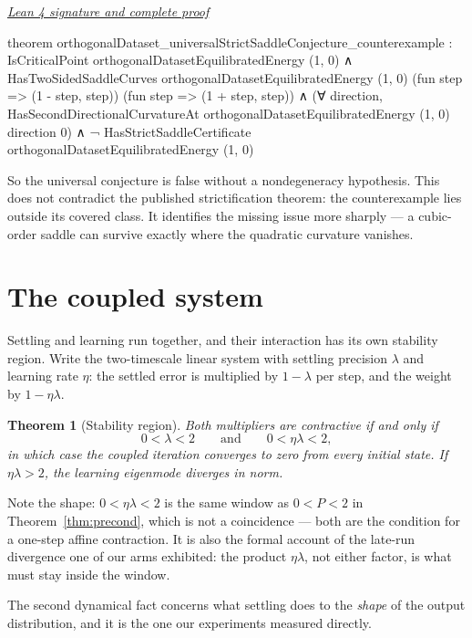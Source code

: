 \documentclass[11pt]{article}
\newtheorem{theorem}{Theorem}[section]
\newcommand{\leancommit}{f3a31db36bb2f944312ee31c1d86c2758109e83a}
\newcommand{\leansignaturelink}[2]{%
  \par\Needspace{0.3\textheight}\smallskip\noindent
  \href{https://github.com/zariuq/MeTTapedia/blob/\leancommit/#1\#L#2}{%
    \scriptsize\itshape Lean 4 signature and complete proof}\par\nobreak}
\begin{document}
\leansignaturelink{lean/mettapedia/Mettapedia/MachineLearning/NeuralNetworks/%
PredictiveCoding/EquilibratedEnergySaddles.lean}{319}
\begin{leansignature}
theorem orthogonalDataset_universalStrictSaddleConjecture_counterexample :
    IsCriticalPoint orthogonalDatasetEquilibratedEnergy (1, 0) ∧
      HasTwoSidedSaddleCurves orthogonalDatasetEquilibratedEnergy (1, 0)
        (fun step => (1 - step, step))
        (fun step => (1 + step, step)) ∧
      (∀ direction,
        HasSecondDirectionalCurvatureAt orthogonalDatasetEquilibratedEnergy
          (1, 0) direction 0) ∧
      ¬ HasStrictSaddleCertificate orthogonalDatasetEquilibratedEnergy (1, 0)
\end{leansignature}

So the universal conjecture is false without a nondegeneracy hypothesis. This does not
contradict the published strictification theorem: the counterexample lies outside its
covered class. It identifies the missing issue more sharply --- a cubic-order saddle can
survive exactly where the quadratic curvature vanishes.

\section{The coupled system}

Settling and learning run together, and their interaction has its own stability region.
Write the two-timescale linear system with settling precision $\lambda$ and learning rate
$\eta$: the settled error is multiplied by $1-\lambda$ per step, and the weight by
$1-\eta\lambda$.

\begin{theorem}[Stability region]\label{thm:coupled}
Both multipliers are contractive if and only if
\[
0 < \lambda < 2 \qquad\text{and}\qquad 0 < \eta\lambda < 2 ,
\]
in which case the coupled iteration converges to zero from every initial state.
If $\eta\lambda > 2$, the learning eigenmode diverges in norm.
\end{theorem}

Note the shape: $0 < \eta\lambda < 2$ is the same window as $0 < P < 2$ in
Theorem~\ref{thm:precond}, which is not a coincidence --- both are the condition for a
one-step affine contraction. It is also the formal account of the late-run divergence one
of our arms exhibited: the product $\eta\lambda$, not either factor, is what must stay
inside the window.

The second dynamical fact concerns what settling does to the \emph{shape} of the output
distribution, and it is the one our experiments measured directly.
\end{document}
